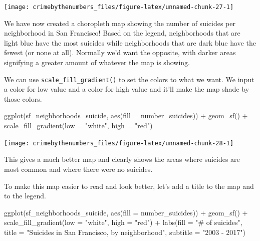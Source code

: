 \documentclass[
]{krantz}
\makeatletter
\newenvironment{Shaded}{\begin{snugshade}}{\end{snugshade}}
\newcommand{\AttributeTok}[1]{\textcolor[rgb]{0.61,0.61,0.61}{#1}}
\newcommand{\FunctionTok}[1]{\textcolor[rgb]{0,0,0}{#1}}
\newcommand{\NormalTok}[1]{#1}
\newcommand{\SpecialCharTok}[1]{\textcolor[rgb]{0,0,0}{#1}}
\newcommand{\StringTok}[1]{\textcolor[rgb]{0.5,0.5,0.5}{#1}}
\newenvironment{kframe}{%
\medskip{}
\setlength{\fboxsep}{.8em}
 \def\at@end@of@kframe{}%
 \ifinner\ifhmode%
  \def\at@end@of@kframe{\end{minipage}}%
  \begin{minipage}{\columnwidth}%
 \fi\fi%
 \def\FrameCommand##1{\hskip\@totalleftmargin \hskip-\fboxsep
 \colorbox{shadecolor}{##1}\hskip-\fboxsep
     \hskip-\linewidth \hskip-\@totalleftmargin \hskip\columnwidth}%
 \MakeFramed {\advance\hsize-\width
   \@totalleftmargin\z@ \linewidth\hsize
   \@setminipage}}%
 {\par\unskip\endMakeFramed%
 \at@end@of@kframe}
\renewenvironment{Shaded}{\begin{kframe}}{\end{kframe}}
\makeatother
\begin{document}
\begin{center}\texttt{[image: crimebythenumbers\_files/figure-latex/unnamed-chunk-27-1]} \end{center}

We have now created a choropleth map showing the number of suicides per neighborhood in San Francisco! Based on the legend, neighborhoods that are light blue have the most suicides while neighborhoods that are dark blue have the fewest (or none at all). Normally we'd want the opposite, with darker areas signifying a greater amount of whatever the map is showing.

We can use \texttt{scale\_fill\_gradient()} to set the colors to what we want. We input a color for low value and a color for high value and it'll make the map shade by those colors.

\begin{Shaded}
\begin{Highlighting}[]
\FunctionTok{ggplot}\NormalTok{(sf\_neighborhoods\_suicide, }\FunctionTok{aes}\NormalTok{(}\AttributeTok{fill =}\NormalTok{ number\_suicides)) }\SpecialCharTok{+}
  \FunctionTok{geom\_sf}\NormalTok{() }\SpecialCharTok{+}
  \FunctionTok{scale\_fill\_gradient}\NormalTok{(}\AttributeTok{low =} \StringTok{"white"}\NormalTok{, }\AttributeTok{high =} \StringTok{"red"}\NormalTok{) }
\end{Highlighting}
\end{Shaded}

\begin{center}\texttt{[image: crimebythenumbers\_files/figure-latex/unnamed-chunk-28-1]} \end{center}

This gives a much better map and clearly shows the areas where suicides are most common and where there were no suicides.

To make this map easier to read and look better, let's add a title to the map and to the legend.

\begin{Shaded}
\begin{Highlighting}[]
\FunctionTok{ggplot}\NormalTok{(sf\_neighborhoods\_suicide, }\FunctionTok{aes}\NormalTok{(}\AttributeTok{fill =}\NormalTok{ number\_suicides)) }\SpecialCharTok{+}
  \FunctionTok{geom\_sf}\NormalTok{() }\SpecialCharTok{+}
  \FunctionTok{scale\_fill\_gradient}\NormalTok{(}\AttributeTok{low =} \StringTok{"white"}\NormalTok{, }\AttributeTok{high =} \StringTok{"red"}\NormalTok{) }\SpecialCharTok{+}
  \FunctionTok{labs}\NormalTok{(}\AttributeTok{fill =} \StringTok{"\# of suicides"}\NormalTok{,}
       \AttributeTok{title =} \StringTok{"Suicides in San Francisco, by neighborhood"}\NormalTok{,}
       \AttributeTok{subtitle =} \StringTok{"2003 {-} 2017"}\NormalTok{) }
\end{Highlighting}
\end{Shaded}
\end{document}
